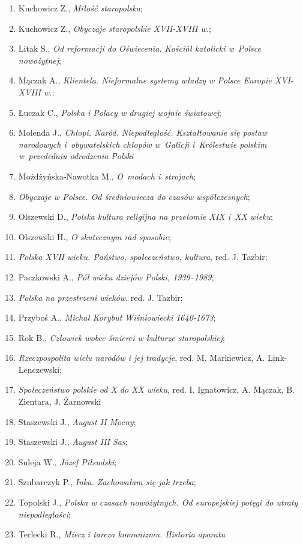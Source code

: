 \documentclass[a4paper,11pt]{article}
\begin{document}
\begin{enumerate}
\item Kuchowicz Z., \emph{Miłość staropolska};
\item Kuchowicz Z., \emph{Obyczaje staropolskie XVII-XVIII w.};
\item Litak S., \emph{Od reformacji do Oświecenia. Kościół katolicki
    w~Polsce nowożytnej};
\item Mączak A., \emph{Klientela. Nieformalne systemy władzy w Polsce
    Europie XVI-XVIII w.};
\item Łuczak C., \emph{Polska i Polacy w drugiej wojnie światowej};
\item Molenda J., \emph{Chłopi. Naród. Niepodległość. Kształtowanie
    się postaw narodowych i~obywatelskich chłopów w~Galicji
    i~Królestwie polskim w~przededniu odrodzenia Polski}
\item Możdżyńska-Nawotka M., \emph{O~modach i~strojach};
\item \emph{Obyczaje w Polsce. Od średniowiecza do czasów
    współczesnych};
\item Olszewski D., \emph{Polska kultura religijna na przełomie XIX
    i~XX wieku};
\item Olszewski H., \emph{O skutecznym rad sposobie};
\item \emph{Polska XVII wieku. Państwo, społeczeństwo, kultura}, red.
  J. Tazbir;
\item Paczkowski A., \emph{Pół wieku dziejów Polski, 1939--1989};
\item \emph{Polska na przestrzeni wieków}, red. J. Tazbir;
\item Przyboś A., \emph{Michał Korybut Wiśniowiecki 1640-1673};
\item Rok B., \emph{Człowiek wobec śmierci w kulturze staropolskiej};
\item \emph{Rzeczpospolita wielu narodów i jej tradycje}, red. M.
  Markiewicz, A. Link-Lenczewski;
\item \emph{Społeczeństwo polskie od X do XX wieku}, red. I.
  Ignatowicz, A. Mączak, B. Zientara, J. Żarnowski
\item Staszewski J., \emph{August II Mocny};
\item Staszewski J., \emph{August III Sas};
\item Suleja W., \emph{Józef Piłsudski};
\item Szubarczyk P., \emph{Inka. Zachowałam się jak trzeba\ld};
\item Topolski J., \emph{Polska w czasach nowożytnych. Od europejskiej
    potęgi do utraty niepodległości};
\item Terlecki R., \emph{Miecz i tarcza komunizmu. Historia aparatu
}
\end{enumerate}
\end{document}
